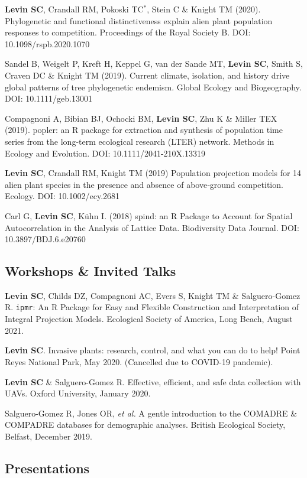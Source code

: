 \documentclass[11pt,]{article}
\begin{document}
\textbf{Levin SC}, Crandall RM, Pokoski TC\(^\ast\), Stein C \& Knight
TM (2020). Phylogenetic and functional distinctiveness explain alien
plant population responses to competition. Proceedings of the Royal
Society B. DOI: 10.1098/rspb.2020.1070

Sandel B, Weigelt P, Kreft H, Keppel G, van der Sande MT, \textbf{Levin
SC}, Smith S, Craven DC \& Knight TM (2019). Current climate, isolation,
and history drive global patterns of tree phylogenetic endemism. Global
Ecology and Biogeography. DOI: 10.1111/geb.13001

Compagnoni A, Bibian BJ, Ochocki BM, \textbf{Levin SC}, Zhu K \& Miller
TEX (2019). popler: an R package for extraction and synthesis of
population time series from the long-term ecological research (LTER)
network. Methods in Ecology and Evolution. DOI: 10.1111/2041-210X.13319

\textbf{Levin SC}, Crandall RM, Knight TM (2019) Population projection
models for 14 alien plant species in the presence and absence of
above‐ground competition. Ecology. DOI: 10.1002/ecy.2681

Carl G, \textbf{Levin SC}, Kühn I. (2018) spind: an R Package to Account
for Spatial Autocorrelation in the Analysis of Lattice Data.
Biodiversity Data Journal. DOI: 10.3897/BDJ.6.e20760

\hypertarget{workshops-invited-talks}{%
\subsection{Workshops \& Invited Talks}\label{workshops-invited-talks}}

\textbf{Levin SC}, Childs DZ, Compagnoni AC, Evers S, Knight TM \&
Salguero-Gomez R. \texttt{ipmr}: An R Package for Easy and Flexible
Construction and Interpretation of Integral Projection Models.
Ecological Society of America, Long Beach, August 2021.

\textbf{Levin SC}. Invasive plants: research, control, and what you can
do to help! Point Reyes National Park, May 2020. (Cancelled due to
COVID-19 pandemic).

\textbf{Levin SC} \& Salguero-Gomez R. Effective, efficient, and safe
data collection with UAVs. Oxford University, January 2020.

Salguero-Gomez R, Jones OR, \emph{et al.} A gentle introduction to the
COMADRE \& COMPADRE databases for demographic analyses. British
Ecological Society, Belfast, December 2019.

\hypertarget{presentations}{%
\subsection{Presentations}\label{presentations}}
\end{document}
